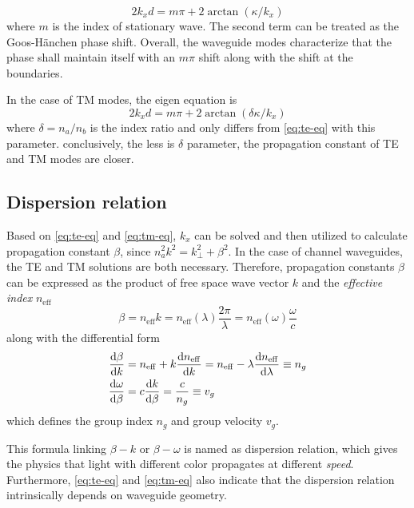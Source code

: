 \begin{equation}\label{eq:te-eq}
    2k_x d = m\pi + 2\arctan(\kappa/k_x)
\end{equation}
where $m$ is the index of stationary wave. The second term can be treated as the Goos-H\"{a}nchen phase shift. Overall, the waveguide modes characterize that the phase shall maintain itself with an $m\pi$ shift along with the shift at the boundaries.

In the case of TM modes, the eigen equation is 
\begin{equation}\label{eq:tm-eq}
    2k_x d = m\pi + 2\arctan(\delta\kappa/k_x)
\end{equation}
where $\delta=n_a/n_b$ is the index ratio and only differs from \autoref{eq:te-eq} with this parameter. conclusively, the less is $\delta$ parameter, the propagation constant of TE and TM modes are closer.

\subsection{Dispersion relation}
Based on \autoref{eq:te-eq} and \autoref{eq:tm-eq}, $k_x$ can be solved and then utilized to calculate propagation constant $\beta$, since $n_a^2k^2 = k_{\perp}^2 + \beta^2$. In the case of channel waveguides, the TE and TM solutions are both necessary. Therefore, propagation constants $\beta$ can be expressed as the product of free space wave vector $k$ and the \textit{ effective index} $n_{\mathrm{eff}}$
\begin{equation}\label{eq:disp_bk}
    \beta = n_{\mathrm{eff}}k = n_{\mathrm{eff}}(\lambda) \frac{2\pi}{\lambda} = n_{\mathrm{eff}}(\omega) \frac{\omega}{c}
\end{equation}
along with the differential form
\begin{align}\label{eq:ng-def}
    \dv{\beta}{k} &= n_{\mathrm{eff}} + k \dv{n_{\mathrm{eff}}}{k} = n_{\mathrm{eff}} - \lambda\dv{n_{\mathrm{eff}}}{\lambda} \equiv n_g \\
    \dv{\omega}{\beta} &= c \dv{k}{\beta} = \frac{c}{n_g} \equiv v_g  
\end{align}
which defines the group index $n_g$ and group velocity $v_g$.

This formula linking $\beta - k$ or $\beta - \omega$ is named as dispersion relation, which gives the physics that light with different color propagates at different \textit{speed}. Furthermore, \autoref{eq:te-eq} and \autoref{eq:tm-eq} also indicate that the dispersion relation intrinsically depends on waveguide geometry.

